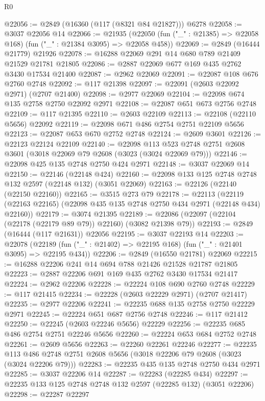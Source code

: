\begin{lexlean}{R0}
\begin{coremodule}
@22056 := @2849 (@16360 (@117 (@8321 @84 @21827))) @6278
@22058 := @3037 @22056 @14
@22066 := @21935
    (@22050 (fun ("_" : @21385) => @22058 @168) (fun ("_" : @21384 @3095) => @22058 @458))
@22069 := @2849 (@16444 @21779) @21926
@22078 := @16288 @22069 @291 @14 @680 @789 @21409 @21529 @21781 @21805
@22086 := @2887 @22069 @677 @169 @435 @2762 @3430 @17534 @21400
@22087 := @2962 @22069
@22091 := @22087 @108 @676 @2760 @2748
@22092 := @117 @21398
@22097 := @22091 (@2603 @22092 @2971) (@2707 @21400)
@22098 := @2977 @22069
@22104 := @22098 @674 @135 @2758 @2750 @22092 @2971
@22108 := @22087 @651 @673 @2756 @2748
@22109 := @117 @21395
@22110 := @2603 @22109
@22113 := @22108 (@22110 @5656) @22092
@22119 := @22098 @671 @486 @2754 @2751 @22109 @5656
@22123 := @22087 @653 @670 @2752 @2748
@22124 := @2609 @3601
@22126 := @22123 @22124 @22109
@22140 := @22098
    @113
    @523
    @2748
    @2751
    @2608
    @3601
    (@3018 @22069 @79 @2608 (@3023 (@3024 @22069 @79)))
@22146 := @22098 @425 @135 @2748 @2750 @424 @2971
@22148 := @3037 @22069 @14
@22150 := @22146 (@22148 @424)
@22160 := @22098 @133 @125 @2748 @2748 @132 @2597 (@22148 @132) (@3051 @22069)
@22163 := @22126 (@22140 (@22150 @22160))
@22165 := @3515 @273 @79
@22178 := @22113
    (@22119 (@22163 @22165) (@22098 @435 @135 @2748 @2750 @434 @2971 (@22148 @434) @22160))
@22179 := @3074 @21395
@22189 := @22086 (@22097 (@22104 (@22178 (@22179 @89 @79)) @22160) (@3082 @21398 @79))
@22193 := @2849 (@16444 (@117 @21631)) @22056
@22195 := @3037 @22193 @14
@22203 := @22078
    (@22189 (fun ("_" : @21402) => @22195 @168) (fun ("_" : @21401 @3095) => @22195 @434))
@22206 := @2849 (@16550 @21781) @22069
@22215 := @16288 @22206 @241 @14 @694 @788 @21426 @21528 @21787 @21805
@22223 := @2887 @22206 @691 @169 @435 @2762 @3430 @17534 @21417
@22224 := @2962 @22206
@22228 := @22224 @108 @690 @2760 @2748
@22229 := @117 @21415
@22234 := @22228 (@2603 @22229 @2971) (@2707 @21417)
@22235 := @2977 @22206
@22241 := @22235 @688 @135 @2758 @2750 @22229 @2971
@22245 := @22224 @651 @687 @2756 @2748
@22246 := @117 @21412
@22250 := @22245 (@2603 @22246 @5656) @22229
@22256 := @22235 @685 @486 @2754 @2751 @22246 @5656
@22260 := @22224 @653 @684 @2752 @2748
@22261 := @2609 @5656
@22263 := @22260 @22261 @22246
@22277 := @22235
    @113
    @486
    @2748
    @2751
    @2608
    @5656
    (@3018 @22206 @79 @2608 (@3023 (@3024 @22206 @79)))
@22283 := @22235 @435 @135 @2748 @2750 @434 @2971
@22285 := @3037 @22206 @14
@22287 := @22283 (@22285 @434)
@22297 := @22235 @133 @125 @2748 @2748 @132 @2597 (@22285 @132) (@3051 @22206)
@22298 := @22287 @22297

\end{coremodule}
\end{lexlean}
